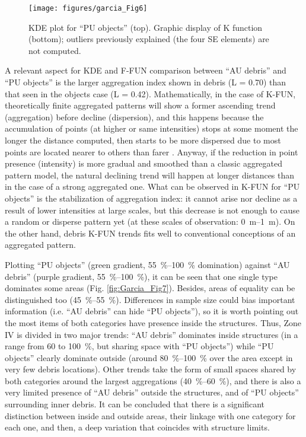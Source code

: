 \begin{figure}
	\texttt{[image: figures/garcia\_Fig6]}
	\centering
	\caption{KDE plot for “PU objects” (top). Graphic display of K function (bottom); outliers previously explained (the four SE elements) are not computed.}
	\label{fig:Garcia_Fig6}
\end{figure}

A relevant aspect for KDE and F-FUN comparison between “AU debris” and “PU objects” is the larger aggregation index shown in debris (L = 0.70) than that seen in the objects case (L = 0.42). Mathematically, in the case of K-FUN, theoretically finite aggregated patterns will show a former ascending trend (aggregation) before decline (dispersion), and this happens because the accumulation of points (at higher or same intensities) stops at some moment the longer the distance computed, then starts to be more dispersed due to most points are located nearer to others than farer \parencite{Maximiano_2008}. Anyway, if the reduction in point presence (intensity) is more gradual and smoothed than a classic aggregated pattern model, the natural declining trend will happen at longer distances than in the case of a strong aggregated one. What can be observed in K-FUN for “PU objects” is the stabilization of aggregation index: it cannot arise nor decline as a result of lower intensities at large scales, but this decrease is not enough to cause a random or disperse pattern yet (at these scales of observation: \SIrange{0}{1}{\metre}). On the other hand, debris K-FUN trends fits well to conventional conceptions of an aggregated pattern. 

Plotting “PU objects” (green gradient, \SIrange{55}{100}{\percent} domination) against “AU debris” (purple gradient, \SIrange{55}{100}{\percent}), it can be seen that one single type dominates some areas (Fig. \ref{fig:Garcia_Fig7}). Besides, areas of equality can be distinguished too (\SIrange{45}{55}{\percent}). Differences in sample size could bias important information (i.e. “AU debris” can hide “PU objects”), so it is worth pointing out the most items of both categories have presence inside the structures. Thus, Zone IV is divided in two major trends: “AU debris” dominates inside structures (in a range from 60 to \SI{100}{\percent}, but sharing space with “PU objects”) while “PU objects” clearly dominate outside (around \SIrange{80}{100}{\percent} over the area except in very few debris locations). Other trends take the form of small spaces shared by both categories around the largest aggregations (\SIrange{40}{60}{\percent}), and there is also a very limited presence of “AU debris” outside the structures, and of “PU objects” surrounding inner debris. It can be concluded that there is a significant distinction between inside and outside areas, their linkage with one category for each one, and then, a deep variation that coincides with structure limits.
 
